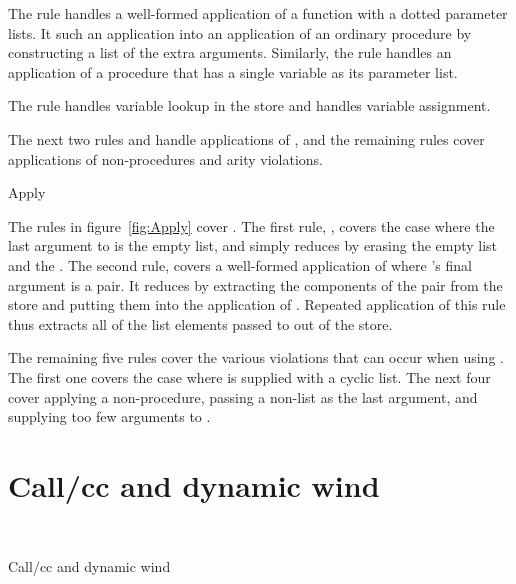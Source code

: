 The rule  handles a well-formed application of a function with a dotted parameter lists.
It such an application into an application of an
ordinary procedure by constructing a list of the extra arguments. Similarly, the rule  handles an application of a procedure that has a single variable as its parameter list.

The rule  handles variable lookup in the store and  handles variable assignment.

The next two rules  and  handle applications of , and the remaining rules cover applications of non-procedures and arity violations.

\beginfig
\subfigureadjust{}
\begin{center}


\end{center}
\caption{Apply}\label{fig:Apply}
\endfig
\subfigurestop{}

The rules in figure~\ref{fig:Apply}
cover .
The first rule, , covers the case where the last argument to
 is the empty list, and simply reduces by erasing the
empty list and the . The second rule, 
covers a well-formed application of  where 's final argument is a pair. It
reduces by extracting the components of the pair from the store and
putting them into the application of . Repeated
application of this rule thus extracts all of the list elements passed
to  out of the store.

The remaining five rules cover the
various violations that can occur when using . The first one covers the case where  is supplied with a cyclic list. The next four cover applying a
non-procedure, passing a non-list as the last argument, and supplying
too few arguments to .

\section{Call/cc and dynamic wind}

\beginfig
\begin{center}
 \\

\end{center}
\caption{Call/cc and dynamic wind}\label{fig:Call-cc--and--dynamic-wind}
\endfig

